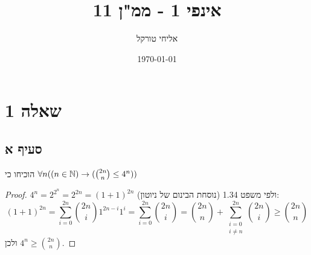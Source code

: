 \documentclass{article}
\title{אינפי 1 - ממ"ן 11}
\author{אליחי טורקל \ID}
\date\today
\begin{document}
	\maketitle %

	\section*{שאלה 1}
	\subsection*{סעיף א}
	הוכיחו כי
	 $\forall n( (n \in \mathbb{N}) \to ({2n \choose n} \leq 4^n) )$

	\begin{proof}
		$4^n = 2^{2^n}=2^{2n}=(1+1)^{2n}$
		ולפי משפט 1.34 (נוסחת הבינום של ניוטון): \\
		\[
			(1+1)^{2n} = \sum_{i=0}^{2n}{{2n \choose i}1^{2n-i}1^i} = \sum_{i=0}^{2n}{2n \choose i} = {2n \choose n} + \sum_{\substack{i=0 \\ i \neq n}}^{2n}{2n \choose i} \geq {2n \choose n}
		\]
		ולכן $4^n \geq {2n \choose n}$.
	\end{proof}

\end{document}
